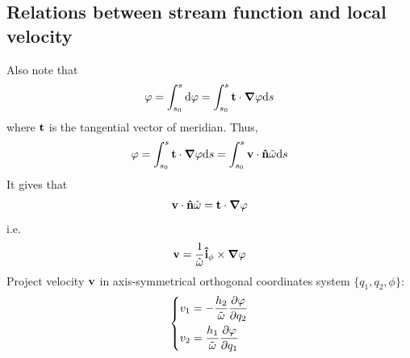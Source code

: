 \documentclass[fontsize=11pt, %
                             paper=a4, %
                             twoside, %
                             captions=tableheading,
                             index=totoc,
                             hyperref]{labbook}
\begin{document}
\begin{addmargin}[4cm]{0cm}
\subsection{Relations between stream function and local velocity}
Also note that
\begin{equation}
\varphi=\int_{s_0}^s\mathrm{d}\varphi=\int_{s_0}^s\mathbf{t}\cdot \mbox{\boldmath$ \nabla $} \varphi \mathrm{d}s
\end{equation}
where $\mathbf{t}$ is the tangential vector of meridian. Thus,
\begin{equation}
\varphi=\int_{s_0}^s\mathbf{t}\cdot \mbox{\boldmath$ \nabla $} \varphi \mathrm{d}s=\int_{s_0}^s\mathbf{v}\cdot \mathbf{\hat{n}}\tilde{\omega}\mathrm{d}s
\end{equation}
It gives that
\begin{equation}
\mathbf{v} \cdot \mathbf{\hat{n}}\tilde{\omega}=\mathbf{t} \cdot \mbox{\boldmath$ \nabla $} \varphi
\end{equation}
i.e.
\begin{equation}
\mathbf{v}=\frac{1}{\tilde{\omega}}\mathbf{\hat{i}}_{\phi}\times\mbox{\boldmath$ \nabla $} \varphi
\end{equation}
Project velocity $\mathbf{v}$ in axis-symmetrical orthogonal coordinates system $\{q_1,q_2,\phi\}$:
\begin{equation}\label{eqn_velocity}
\left\{
\begin{aligned}
v_1&=-\frac{h_2}{\tilde{\omega}}\frac{\partial \varphi}{\partial q_2}\\
v_2&=\frac{h_1}{\tilde{\omega}}\frac{\partial \varphi}{\partial q_1}
\end{aligned}
\right.
\end{equation}

\end{addmargin}
\end{document}
